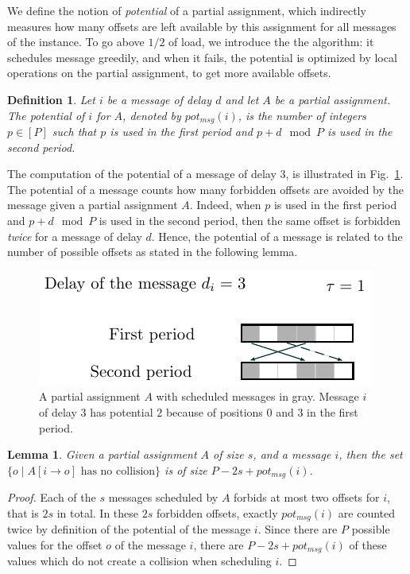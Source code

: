 \documentclass[pdflatex,sn-mathphys,iicol]{sn-jnl}%
\theoremstyle{thmstyleone}%
\newtheorem{lemma}[theorem]{Lemma}
\theoremstyle{thmstyletwo}%
\theoremstyle{thmstylethree}%
\newtheorem{definition}{Definition}%
\begin{document}
We define the notion of \emph{potential} of a partial assignment, which indirectly measures how many offsets are left available by this assignment for all messages of the instance. To go above $1/2$ of load, we introduce the the \swapandmove algorithm: it schedules message greedily, and when it fails, the potential is optimized by local operations on the partial assignment, to get more available offsets. 

\begin{definition}
Let $i$ be a message of delay $d$ and let $A$ be a partial assignment.
The potential of $i$ for $A$, denoted by $pot_{msg}(i)$, is the number of integers $p \in [P]$ such that $p$ is used in the first period and $p+d \mod P$ is used in the second period. 
\end{definition}

The computation of the potential of a message of delay $3$, is illustrated in Fig.~\ref{fig:messagepotential}. The potential of a message counts how many forbidden offsets are avoided by the message given a partial assignment $A$.
Indeed, when $p$ is used in the first period and $p+d \mod P$ is used in the second period, then the same offset is forbidden \emph{twice} for a message of delay $d$. Hence, the potential of a message is related to the number of possible offsets as stated in the following lemma. 
\begin{figure}
\begin{center}
\includegraphics[scale=1]{messagepotential}
\end{center}
\caption{A partial assignment $A$ with scheduled messages in gray. Message $i$ of delay $3$ has potential $2$ because of positions $0$ and $3$ in the first period.}
\label{fig:messagepotential}
\end{figure}

\begin{lemma}\label{lemma:pot_msg}
Given a partial assignment $A$ of size $s$, and a message $i$, then the set $\{o \mid A[i \rightarrow o] \text{ has no collision}\}$ is of size $P - 2s + pot_{msg}(i)$.
\end{lemma}
\begin{proof}
 Each of the $s$ messages scheduled by $A$ forbids at most two offsets for $i$, that is $2s$ in total. In these $2s$ forbidden offsets, exactly $pot_{msg}(i)$ are counted twice by definition of the potential of the message $i$. Since there are $P$ possible values for the offset $o$ of the message $i$, there are $P - 2s + pot_{msg}(i)$ of these values which do not create a collision when scheduling $i$.\end{proof}
\end{document}

